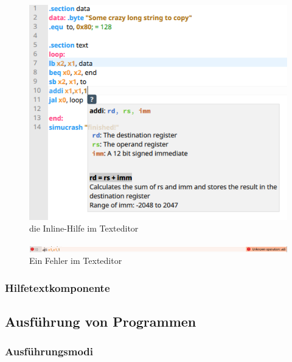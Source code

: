 \begin{figure}[ht]
	\centering
  \includegraphics[scale=1]{Images/Editor_help}
	\caption{die Inline-Hilfe im Texteditor}
	\label{Editor_Help}
\end{figure}



\begin{figure}[ht]
	\centering
  \includegraphics[width=\textwidth]{Images/Editor_error}
	\caption{Ein Fehler im Texteditor}
	\label{Editor_Error}
\end{figure}


\subsubsection{Hilfetextkomponente}
\label{help-component}


\subsection{Ausführung von Programmen}

\subsubsection{Ausführungsmodi}

